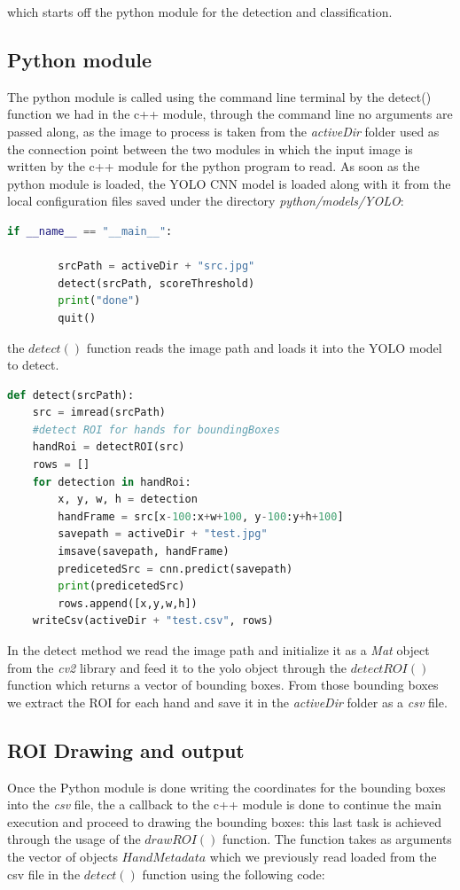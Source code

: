 which starts off the python module for the detection and classification. 

\subsection{Python module}
The python module is called using the command line terminal by the detect() function we had in the c++ module, through the command line no arguments are passed along,
as the image to process is taken from the \textit{activeDir} folder used as the connection point between the two modules in which the input image is written by the 
c++ module for the python program to read. As soon as the python module is loaded, the YOLO CNN model is loaded along with it from the local configuration files
saved under the directory \textit{python/models/YOLO}:

\begin{lstlisting}[language=python]
    if __name__ == "__main__":

        srcPath = activeDir + "src.jpg"
        detect(srcPath, scoreThreshold)
        print("done")
        quit()
\end{lstlisting}

the $detect()$ function reads the image path and loads it into the YOLO model to detect. 

\begin{lstlisting}[language=python]
    def detect(srcPath):
    src = imread(srcPath)
    #detect ROI for hands for boundingBoxes
    handRoi = detectROI(src)
    rows = []
    for detection in handRoi:
        x, y, w, h = detection
        handFrame = src[x-100:x+w+100, y-100:y+h+100]
        savepath = activeDir + "test.jpg"
        imsave(savepath, handFrame)
        predicetedSrc = cnn.predict(savepath)
        print(predicetedSrc)
        rows.append([x,y,w,h])
    writeCsv(activeDir + "test.csv", rows)
\end{lstlisting}

In the detect method we read the image path and initialize it as a \textit{Mat} object from the \textit{cv2} library and feed it to the 
yolo object through the $detectROI()$ function which returns a vector of bounding boxes. From those bounding boxes we extract the ROI for each hand and save it in the
\textit{activeDir} folder as a \textit{csv} file.

\subsection{ROI Drawing and output}
Once the Python module is done writing the coordinates for the bounding boxes into the \textit{csv} file, 
the a callback to the c++ module is done to continue the main execution and proceed to drawing the bounding boxes:
this last task is achieved through the usage of the $drawROI()$ function. The function takes as arguments the vector of objects $HandMetadata$ which we previously
read loaded from the csv file in the $detect()$ function using the following code:

